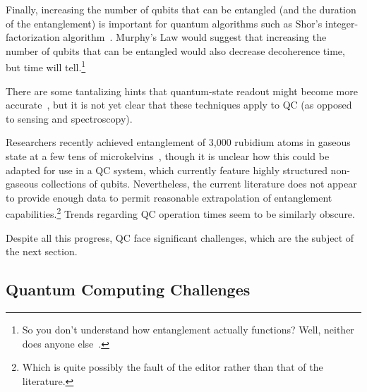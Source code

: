 Finally, increasing the number of qubits that can be
entangled (and the duration of the entanglement) is important for
quantum algorithms such as Shor's integer-factorization
algorithm~\cite{Shor:1997:PAP:264393.264406,Kendon:2006:ERS:2011698.2011704}.
Murphy's Law would suggest that increasing the number of qubits that
can be entangled would also decrease decoherence time, but time will
tell.\footnote{
	So you don't understand how entanglement actually functions?
	Well, neither does anyone else~\cite{ScottAaronson2018QuantumInterp}.}

There are some tantalizing hints that quantum-state readout might become
more accurate~\cite{GiorgioColangelo2017QC-SpinAngleAmplitude},
but it is not yet clear that these techniques apply to QC
(as opposed to sensing and spectroscopy).

Researchers recently achieved entanglement of 3,000
rubidium atoms in gaseous state at a few tens of
microkelvins~\cite{RobertMcConnell2015QC-Entangle3000Atoms},
though it is unclear how this could be adapted for use in
a QC system, which currently feature highly structured non-gaseous
collections of qubits.
Nevertheless, the current literature does not appear to provide enough
data to permit reasonable extrapolation of entanglement capabilities.\footnote{
	Which is quite possibly the fault of the editor rather than that
	of the literature.}
Trends regarding QC operation times seem to be similarly obscure.

Despite all this progress, QC face significant challenges, which are
the subject of the next section.

\subsection{Quantum Computing Challenges}
\label{sec:future:Quantum Computing Challenges}

